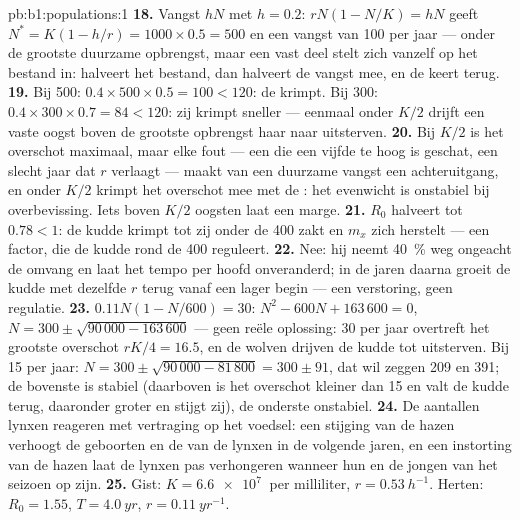\begin{solution}{pb:b1:populations:1}
\textbf{18.} Vangst $hN$ met $h = 0.2$: $rN(1 - N/K) = hN$ geeft $N^* =
K(1 - h/r) = 1000\times 0.5 = 500$ en een vangst van \num{100} per jaar ---
onder de grootste duurzame opbrengst, maar een vast deel stelt zich vanzelf
op het bestand in: halveert het bestand, dan halveert de vangst mee, en de
 keert terug.
\textbf{19.} Bij 500: $0.4\times 500\times 0.5 = 100 < 120$: de 
krimpt. Bij 300: $0.4\times 300\times 0.7 = 84 < 120$: zij krimpt sneller
--- eenmaal onder $K/2$ drijft een vaste oogst boven de grootste opbrengst
haar naar uitsterven.
\textbf{20.} Bij $K/2$ is het overschot maximaal, maar elke fout --- een
 die een vijfde te hoog is geschat, een slecht jaar dat $r$ verlaagt
--- maakt van een duurzame vangst een achteruitgang, en onder $K/2$ krimpt
het overschot mee met de : het evenwicht is onstabiel bij
overbevissing. Iets boven $K/2$ oogsten laat een marge.
\textbf{21.} $R_0$ halveert tot $0.78 < 1$: de kudde krimpt tot zij onder de
400 zakt en $m_x$ zich herstelt --- een  factor, die
de kudde rond de 400 reguleert.
\textbf{22.} Nee: hij neemt \qty{40}{\%} weg ongeacht de omvang en laat het
tempo per hoofd onveranderd; in de jaren daarna groeit de kudde met dezelfde
$r$ terug vanaf een lager begin --- een verstoring, geen regulatie.
\textbf{23.} $0.11N(1 - N/600) = 30$: $N^2 - 600N + 163\,600 = 0$,
$N = 300\pm\sqrt{90\,000 - 163\,600}$ --- geen reële oplossing: 30 per jaar
overtreft het grootste overschot $rK/4 = 16.5$, en de wolven drijven de
kudde tot uitsterven. Bij 15 per jaar: $N = 300\pm\sqrt{90\,000 -
81\,800} = 300\pm 91$, dat wil zeggen 209 en 391; de bovenste is stabiel
(daarboven is het overschot kleiner dan 15 en valt de kudde terug, daaronder
groter en stijgt zij), de onderste onstabiel.
\textbf{24.} De aantallen lynxen reageren met vertraging op het voedsel: een
stijging van de hazen verhoogt de geboorten en de  van de lynxen
in de volgende jaren, en een instorting van de hazen laat de lynxen pas
verhongeren wanneer hun  en de jongen van het seizoen op zijn.
\textbf{25.} Gist: $K = \qty{6.6e7}{}$  per milliliter, $r =
\qty{0.53}{h^{-1}}$. Herten: $R_0 = 1.55$, $T = \qty{4.0}{yr}$, $r =
\qty{0.11}{yr^{-1}}$.
\end{solution}
